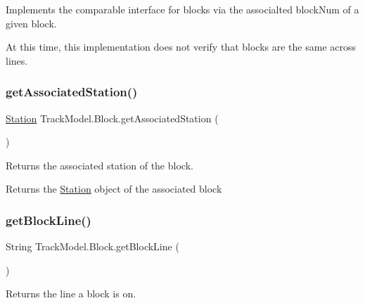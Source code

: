 Implements the comparable interface for blocks via the associalted block\+Num of a given block. 

At this time, this implementation does not verify that blocks are the same across lines. \mbox{\label{classTrackModel_1_1Block_ad01125a6c501452bf33320b01471a24a}} 
\subsubsection{\texorpdfstring{get\+Associated\+Station()}{getAssociatedStation()}}
{\footnotesize\ttfamily \hyperlink{classTrackModel_1_1Station}{Station} Track\+Model.\+Block.\+get\+Associated\+Station (\begin{DoxyParamCaption}{ }\end{DoxyParamCaption})}



Returns the associated station of the block. 

\begin{DoxyReturn}{Returns}
the \hyperlink{classTrackModel_1_1Station}{Station} object of the associated block 
\end{DoxyReturn}
\mbox{\label{classTrackModel_1_1Block_a6f5a001898b82c18e371aebeca433eec}} 
\subsubsection{\texorpdfstring{get\+Block\+Line()}{getBlockLine()}}
{\footnotesize\ttfamily String Track\+Model.\+Block.\+get\+Block\+Line (\begin{DoxyParamCaption}{ }\end{DoxyParamCaption})}



Returns the line a block is on. 

\mbox{\label{classTrackModel_1_1Block_a715fbe2efb7d55f92eab33cb635a4a00}} 
